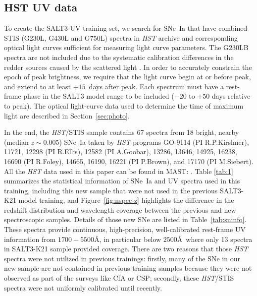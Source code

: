 \documentclass[twocolumn,tighten,times,floatfix]{aastex631}
\begin{document}
\subsection{HST UV data}

 


To create the SALT3-UV training set, we search for SNe~Ia that have combined STIS (G230L, G430L and G750L) spectra in {\it HST} archive and corresponding optical light curves sufficient for measuring light curve parameters. 
The G230LB spectra are not included due to the systematic calibration differences in the redder sources caused by the scattered light \citep{Worthey22}.
In order to accurately constrain the epoch of peak brightness, we require that the light curve begin at or before peak, and extend to at least $+15$~days after peak. Each spectrum must have a rest-frame phase in the SALT3 model range to be included ($-20$ to $+50$ days relative to peak).
The optical light-curve data used to determine the time of maximum light are described in Section~\ref{sec:photo}. 



In the end, the {\it HST}/STIS sample contains 67 spectra from 18 bright, nearby (median $z \sim 0.005$) SNe~Ia taken by {\it HST} programs GO-9114 (PI R.P.Kirshner), 11721, 12298 (PI R.Ellis), 12582 (PI A.Goobar), 13286, 13646, 14925, 16238, 16690 (PI R.Foley), 14665, 16190, 16221 (PI P.Brown), and 17170 (PI M.Siebert). All the {\it HST} data used in this paper can be found in MAST: .
Table \ref{tab:1} summarizes the statistical information of SNe~Ia and UV spectra used in this training, including this new sample that were not used in the previous SALT3-K21 model training, and Figure~\ref{fig:nspec-z} highlights the difference in the redshift distribution and wavelength coverage between the previous and new spectroscopic samples. 
Details of those new SNe are listed in Table~\ref{tab:sninfo}. These spectra provide continuous, high-precision, well-calibrated rest-frame UV information from $1700-5500$\AA, in particular below $2500$\AA\ where only 13 spectra in SALT3-K21 sample provided coverage. There are two reasons that those \textit{HST} spectra were not utilized in previous trainings: firstly, many of the SNe in our new sample are not contained in previous training samples because they were not observed as part of the surveys like CfA or CSP; secondly, these \textit{HST}/STIS spectra were not uniformly calibrated until recently.
\end{document}
